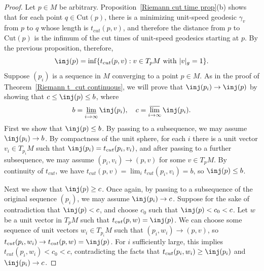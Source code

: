 \begin{proof}
Let $p\in M$ be arbitrary. Proposition~\ref{Riemann cut time prop}(b) shows that for each point $q\in\mathrm{Cut}(p)$, there is a minimizing unit-speed geodesic 
$\gamma_v$ from $p$ to $q$ whose length is $t_{cut}(p,v)$, and therefore the distance from $p$ to $\mathrm{Cut}(p)$ is the infimum of the cut times of unit-speed 
geodesics starting at $p$. By the previous proposition, therefore,
\[\inj(p)=\inf\{ t_{cut}(p,v):v\in T_pM\text{ with }|v|_g=1\}.\]
Suppose $(p_i)$ is a sequence in $M$ converging to a point $p\in M$. As in the proof of Theorem~\ref{Riemann t_cut continuous}, we will prove that $\inj(p_i)\to\inj(p)$ 
by showing that $c\leq\inj(p)\leq b$, where
\[b=\varliminf_{i\to\infty}\inj(p_i),\quad c=\varlimsup_{i\to\infty}\inj(p_i).\]
First we show that $\inj(p)\leq b$. By passing to a subsequence, we may assume $\inj(p_i)\to b$. By compactness of the unit sphere, for each $i$ there is a unit vector 
$v_i\in T_{p_i}M$ such that $\inj(p_i)=t_{cut}(p_i,v_i)$, and after passing to a further subsequence, we may assume $(p_i,v_i)\to (p,v)$ for some $v\in T_pM$. By 
continuity of $t_{cut}$, we have $t_{cut}(p,v)=\lim_{i}t_{cut}(p_i,v_i)=b$, so $\inj(p)\leq b$.\par
Next we show that $\inj(p)\geq c$. Once again, by passing to a subsequence of the original sequence $(p_i)$, we may assume $\inj(p_i)\to c$. Suppose for the sake of 
contradiction that $\inj(p)<c$, and choose $c_0$ such that $\inj(p)<c_0<c$. Let $w$ be a unit vector in $T_pM$ such that $t_{cut}(p,w)=\inj(p)$. We can choose some 
sequence of unit vectors $w_i\in T_{p_i}M$ such that $(p_i,w_i)\to(p,v)$, so $t_{cut}(p_i,w_i)\to t_{cut}(p,w)=\inj(p)$. For $i$ sufficiently large, this implies 
$t_{cut}(p_i,w_i)<c_0<c$, contradicting the facts that $t_{cut}(p_i,w_i)\geq\inj(p_i)$ and $\inj(p_i)\to c$.
\end{proof}